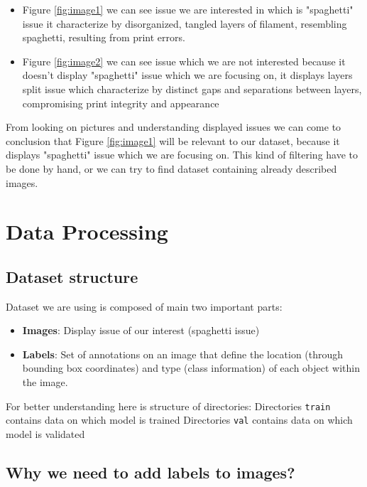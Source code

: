 \documentclass[12pt,a4paper]{article}
\begin{document}
\begin{itemize}
    \item Figure \ref{fig:image1} we can see issue we are interested in which is "spaghetti" issue it characterize by disorganized, tangled layers of filament, resembling spaghetti, resulting from print errors. 
    \item Figure \ref{fig:image2} we can see issue which we are not interested because it doesn't display "spaghetti" issue which we are focusing on, it displays layers split issue which characterize by distinct gaps and separations between layers, compromising print integrity and appearance
\end{itemize}

From looking on pictures and understanding displayed issues we can come to conclusion that Figure \ref{fig:image1} will be relevant to our dataset, because it displays "spaghetti" issue which we are focusing on. This kind of filtering have to be done by hand, or we can try to find dataset containing already described images.
\section{Data Processing}
\subsection{Dataset structure}
Dataset we are using is composed of main two important parts:
\begin{itemize}
    \item \textbf{Images}: Display issue of our interest (spaghetti issue)
    
    \item \textbf{Labels}: Set of annotations on an image that define the location (through bounding box coordinates) and type (class information) of each object within the image. 
\end{itemize}
For better understanding here is structure of directories:
\smallbreak
{}
\medbreak
\noindent
Directories \verb|train| contains data on which model is trained 
\smallbreak
\noindent
Directories \verb|val| contains data on which model is validated 
\subsection{Why we need to add labels to images?}
\end{document}
